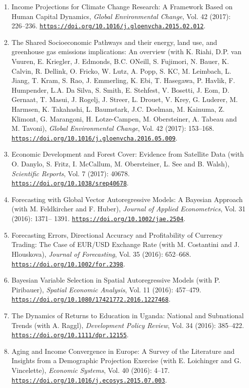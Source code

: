 \documentclass[10pt]{res} %
\newcommand{\doiurl}[1]{\href{https://doi.org/#1}{\nolinkurl{https://doi.org/#1}}}
\begin{document}
\begin{resume}
\begin{enumerate}
\item Income Projections for Climate Change Research: A Framework Based on Human Capital Dynamics, \textit{Global Environmental Change}, Vol. 42 (2017): 226--236. \doiurl{10.1016/j.gloenvcha.2015.02.012}.
\item The Shared Socioeconomic Pathways and their energy, land use, and greenhouse gas emissions implications: An overview (with K. Riahi, D.P. van Vuuren, E. Kriegler, J. Edmonds, B.C. ONeill, S. Fujimori, N. Bauer, K. Calvin, R. Dellink, O. Fricko, W. Lutz, A. Popp, S. KC, M. Leimbach, L. Jiang, T. Kram, S. Rao, J. Emmerling, K. Ebi, T. Hasegawa, P. Havlik, F. Humpender, L.A. Da Silva, S. Smith, E. Stehfest, V. Bosetti, J. Eom, D. Gernaat, T. Masui, J. Rogelj, J. Streer, L. Drouet, V. Krey, G. Luderer, M. Harmsen, K. Takahashi, L. Baumstark, J.C. Doelman, M. Kainuma, Z. Klimont, G. Marangoni, H. Lotze-Campen, M. Obersteiner, A. Tabeau and M. Tavoni), \textit{Global Environmental Change}, Vol. 42 (2017): 153--168. \doiurl{10.1016/j.gloenvcha.2016.05.009}.
\item Economic Development and Forest Cover: Evidence from Satellite Data (with O. Danylo, S. Fritz, I. McCallum, M. Obersteiner, L. See and B. Walsh), \textit{Scientific Reports}, Vol. 7 (2017): 40678. \doiurl{10.1038/srep40678}.
\item Forecasting with Global Vector Autoregressive Models: A Bayesian Approach (with M. Feldkircher and F. Huber), \textit{Journal of Applied Econometrics}, Vol. 31 (2016): 1371-- 1391. \doiurl{10.1002/jae.2504}.
\item Forecasting Errors, Directional Accuracy and Profitability of Currency Trading: The Case of EUR/USD Exchange Rate (with M. Costantini and J. Hlouskova), \textit{Journal of Forecasting}, Vol. 35 (2016): 652--668. \doiurl{10.1002/for.2398}.
\item Bayesian Variable Selection in Spatial Autoregressive Models (with P. Piribauer), \textit{Spatial Economic Analysis}, Vol. 11 (2016): 457--479. \doiurl{10.1080/17421772.2016.1227468}.
\item The Dynamics of Returns to Education in Uganda: National and Subnational Trends (with A. Raggl), \textit{Development Policy Review}, Vol. 34 (2016): 385--422. \doiurl{10.1111/dpr.12155}.
\item Aging and Income Convergence in Europe: A Survey of the Literature and Insights from a Demographic Projection Exercise (with E. Loichinger and G. Vincelette),\textit{ Economic Systems}, Vol. 40 (2016): 4--17. \doiurl{10.1016/j.ecosys.2015.07.003}.

\end{enumerate}
\end{resume}
\end{document}
